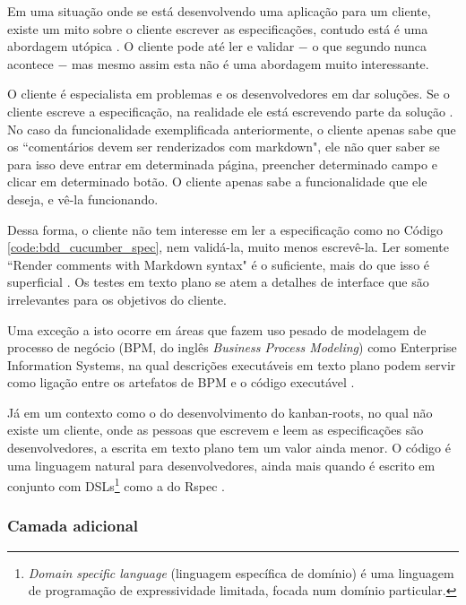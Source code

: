 Em uma situação onde se está desenvolvendo uma aplicação para um cliente, existe um mito sobre o cliente escrever as especificações, contudo está é uma abordagem utópica \cite{SteakOverCucumber, CucumberForVegetarians, ClientsWritingCucumber}. O cliente pode até ler e validar $-$ o que segundo  nunca acontece $-$ mas mesmo assim esta não é uma abordagem muito interessante.

O cliente é especialista em problemas e os desenvolvedores em dar soluções. Se o cliente escreve a especificação, na realidade ele está escrevendo parte da solução \cite{SteakOverCucumber}. No caso da funcionalidade exemplificada anteriormente, o cliente apenas sabe que os ``comentários devem ser renderizados com markdown", ele não quer saber se para isso deve entrar em determinada página, preencher determinado campo e clicar em determinado botão. O cliente apenas sabe a funcionalidade que ele deseja, e vê-la funcionando.

Dessa forma, o cliente não tem interesse em ler a especificação como no Código \ref{code:bdd_cucumber_spec}, nem validá-la, muito menos escrevê-la. Ler somente ``Render comments with Markdown syntax" é o suficiente, mais do que isso é superficial \cite{WhyBotherWithCucumberTesting}. Os testes em texto plano se atem a detalhes de interface que são irrelevantes para os objetivos do cliente.

Uma exceção a isto ocorre em áreas que fazem uso pesado de modelagem de processo de negócio (BPM, do inglês \textit{Business Process Modeling}) como Enterprise Information Systems, na qual descrições executáveis em texto plano podem servir como ligação entre os artefatos de BPM e o código executável \cite{IntroducingBLDD}.

Já em um contexto como o do desenvolvimento do kanban-roots, no qual não existe um cliente, onde as pessoas que escrevem e leem as especificações são desenvolvedores, a escrita em texto plano tem um valor ainda menor. O código é uma linguagem natural para desenvolvedores, ainda mais quando é escrito em conjunto com DSLs\footnote{\textit{Domain specific language} (linguagem específica de domínio) é uma linguagem de programação de expressividade limitada, focada num domínio particular.} como a do Rspec \cite{SteakOverCucumber}.


\subsubsection{Camada adicional} %
\label{subsub:camada_adicional}

